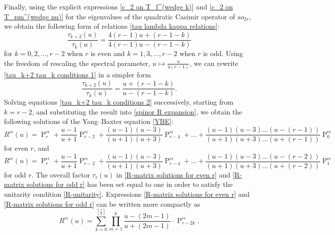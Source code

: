 \documentclass[a4paper]{article}
\renewcommand{\=}{\ =\ }
\DeclareMathOperator{\proj}{P}
\numberwithin{equation}{section}
\theoremstyle{remark}
\begin{document}
Finally, using the explicit expressions \eqref{c_2 on T_f^(wedge k)} and
\eqref{c_2 on T_pm^(wedge nu)} for the eigenvalues of the quadratic Casimir
operator of $so_{2r}$, we obtain the following form of relations
\eqref{tau lambda kappa relations}:
\begin{equation}\label{tau_k+2 tau_k conditions 1}
\frac{\tau_{k+2}(u)}{\tau_k(u)}
=
\frac{4(r-1)u+(r-1-k)}{4(r-1)u-(r-1-k)}
\end{equation}
for $k=0,2,\dots,r-2$ when $r$ is even and $k=1,3,\dots,r-2$ when $r$ is odd.
Using the freedom of rescaling the spectral parameter,
$u\mapsto \frac{u}{4(r-1)}$, we can rewrite
\eqref{tau_k+2 tau_k conditions 1} in a simpler form
\begin{equation}\label{tau_k+2 tau_k conditions 2}
\frac{\tau_{k+2}(u)}{\tau_k(u)}
=
\frac{u+(r-1-k)}{u-(r-1-k)}.
\end{equation}
Solving equations \eqref{tau_k+2 tau_k conditions 2} successively, starting
from $k=r-2$, and substituting the result into
\eqref{spinor R expansion}, we obtain the following solutions of the
Yang--Baxter equation \eqref{YBE}:
\begin{equation}\label{R-matrix solutions for even r}
R^{\epsilon\epsilon}(u)
=
\proj_r^{\epsilon\epsilon}
+\frac{u-1}{u+1}\proj_{r-2}^{\epsilon\epsilon}
+\frac{(u-1)(u-3)}{(u+1)(u+3)}\proj_{r-4}^{\epsilon\epsilon}
+\dots
+\frac{(u-1)(u-3)\dots(u-(r-1))}
      {(u+1)(u+3)\dots(u+(r-1))}
\proj_0^{\epsilon\epsilon}
\end{equation}
for even $r$, and
\begin{equation}\label{R-matrix solutions for odd r}
R^{\epsilon\epsilon}(u)
=
\proj_r^{\epsilon\epsilon}
+\frac{u-1}{u+1}\proj_{r-2}^{\epsilon\epsilon}
+\frac{(u-1)(u-3)}{(u+1)(u+3)}\proj_{r-4}^{\epsilon\epsilon}
+\dots
+\frac{(u-1)(u-3)\dots(u-(r-2))}
      {(u+1)(u+3)\dots(u+(r-2))}
\proj_1^{\epsilon\epsilon}
\end{equation}
for odd $r$. The overall factor $\tau_r(u)$ in
\eqref{R-matrix solutions for even r} and
\eqref{R-matrix solutions for odd r} has been set equal to one in order to
satisfy the unitarity condition \eqref{R-unitarity}.
Expressions \eqref{R-matrix solutions for even r} and
\eqref{R-matrix solutions for odd r} can be written more compactly as
\begin{equation}\label{R-matrix solutions for general r}
R^{\epsilon\epsilon}(u)
=
\sum_{k=0}^{[\frac{r}{2}]}
\prod_{m=1}^{k}
\frac{u-(2m-1)}{u+(2m-1)}
\cdot
\proj_{r-2k}^{\epsilon\epsilon}.
\end{equation}
\end{document}
